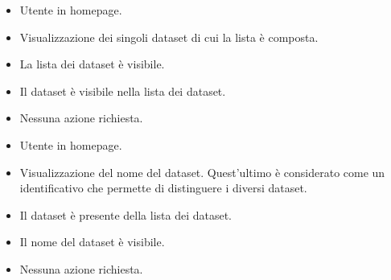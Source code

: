     \UCdsc
    { %
        \begin{itemize}
            \item Utente in homepage.
        \end{itemize}
    }
    { %
        \begin{itemize}
            \item Visualizzazione dei singoli dataset di cui la lista è composta.
        \end{itemize}
    }
    { %
        \begin{itemize}
            \item La lista dei dataset è visibile.
        \end{itemize}
    }
    { %
        \begin{itemize}
            \item Il dataset è visibile nella lista dei dataset.
        \end{itemize}
    }
    { %
        \begin{itemize}
            \item Nessuna azione richiesta.
        \end{itemize}
    }

    \UCdsc
    { %
        \begin{itemize}
            \item Utente in homepage.
        \end{itemize}
    }
    { %
        \begin{itemize}
            \item Visualizzazione del nome del dataset. Quest'ultimo è considerato come un identificativo che permette di distinguere i diversi dataset.
        \end{itemize}
    }
    { %
        \begin{itemize}
            \item Il dataset è presente della lista dei dataset.
        \end{itemize}
    }
    { %
        \begin{itemize}
            \item Il nome del dataset è visibile.
        \end{itemize}
    }
    { %
        \begin{itemize}
            \item Nessuna azione richiesta.
        \end{itemize}
    }


